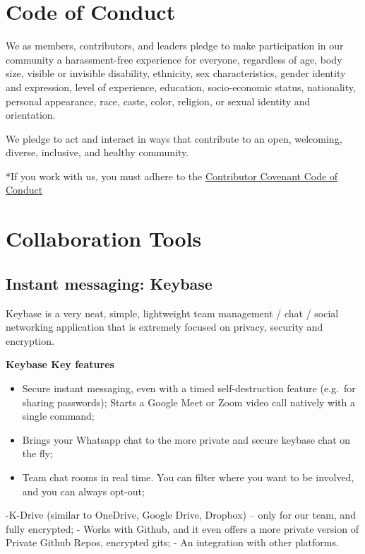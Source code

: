 \documentclass[
  fontsize=13pt,
  english,
  a4paper,
  openany, a4paper, oneside]{book}
\begin{document}
\hypertarget{pledge}{%
\section{Code of Conduct}\label{pledge}}

We as members, contributors, and leaders pledge to make participation in our
community a harassment-free experience for everyone, regardless of age, body
size, visible or invisible disability, ethnicity, sex characteristics, gender
identity and expression, level of experience, education, socio-economic status,
nationality, personal appearance, race, caste, color, religion, or sexual identity and orientation.

We pledge to act and interact in ways that contribute to an open, welcoming,
diverse, inclusive, and healthy community.

*If you work with us, you must adhere to the \protect\hyperlink{covenant}{Contributor Covenant Code of Conduct}

\hypertarget{collaboration-tools}{%
\section{Collaboration Tools}\label{collaboration-tools}}

\hypertarget{keybase}{%
\subsection{Instant messaging: Keybase}\label{keybase}}

Keybase is a very neat, simple, lightweight team management / chat / social networking application that is extremely focused on privacy, security and encryption.

\textbf{Keybase Key features}

\begin{itemize}
\item
  Secure instant messaging, even with a timed self-destruction feature (e.g.~for sharing passwords);
  Starts a Google Meet or Zoom video call natively with a single command;
\item
  Brings your Whatsapp chat to the more private and secure keybase chat on the fly;
\item
  Team chat rooms in real time. You can filter where you want to be involved, and you can always opt-out;
\end{itemize}

-K-Drive (similar to OneDrive, Google Drive, Dropbox) -- only for our team, and fully encrypted;
- Works with Github, and it even offers a more private version of Private Github Repos, encrypted gits;
- An integration with other platforms.
\end{document}
